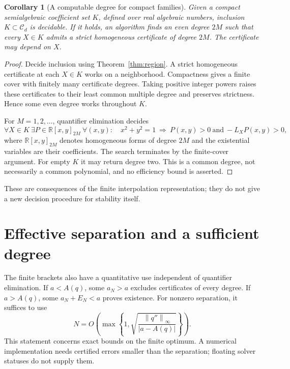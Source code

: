 \documentclass[11pt,a4paper]{article}
\newtheorem{corollary}[theorem]{Corollary}
\theoremstyle{remark}\newtheorem{remark}[theorem]{Remark}
\newcommand{\R}{\mathbb R}
\newcommand{\norm}[1]{\left\lVert #1\right\rVert}
\begin{document}
\begin{corollary}[A computable degree for compact families]\label{cor:compact}
Given a compact semialgebraic coefficient set \(K\), defined over real
algebraic numbers, inclusion \(K\subset\mathcal C_d\) is decidable.
If it holds, an algorithm finds an even degree \(2M\) such that every
\(X\in K\) admits a strict homogeneous certificate of degree \(2M\).
The certificate may depend on \(X\).
\end{corollary}
\begin{proof}
Decide inclusion using Theorem~\ref{thm:region}. A strict homogeneous
certificate at each \(X\in K\) works on a neighborhood. Compactness
gives a finite cover with finitely many certificate degrees. Taking
positive integer powers raises these certificates to their least common
multiple degree and preserves strictness. Hence some even degree works
throughout \(K\).

For \(M=1,2,\ldots\), quantifier elimination decides
\[
 \forall X\in K\ \exists P\in\R[x,y]_{2M}\ \forall(x,y):\quad
 x^2+y^2=1\ \Longrightarrow\ P(x,y)>0\ \text{and}\ -L_XP(x,y)>0,
\]
where \(\R[x,y]_{2M}\) denotes homogeneous forms of degree \(2M\)
and the existential variables are their coefficients. The search
terminates by the finite-cover argument. For empty \(K\) it may return
degree two. This is a common degree, not necessarily a common polynomial,
and no efficiency bound is asserted.
\end{proof}

These are consequences of the finite interpolation representation;
they do not give a new decision procedure for stability itself.

\section{Effective separation and a sufficient degree}
The finite brackets also have a quantitative use independent of
quantifier elimination. If \(a<A(q)\), some \(a_N>a\) excludes
certificates of every degree. If \(a>A(q)\), some \(a_N+E_N<a\)
proves existence. For nonzero separation, it suffices to use
\[
 N=O\!\left(\max\left\{1,
 \sqrt{\frac{\norm{q''}_\infty}{|a-A(q)|}}\right\}\right).
\]
This statement concerns exact bounds on the finite optimum.
A numerical implementation needs certified errors smaller than
the separation; floating solver statuses do not supply them.
\end{document}

